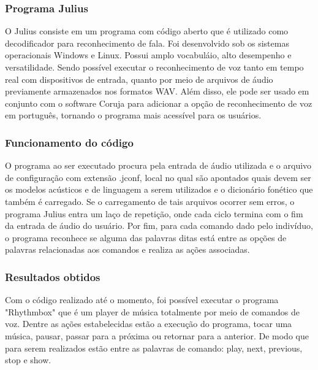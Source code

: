 \subsubsection{Programa Julius}

O Julius consiste em um programa com código aberto que é utilizado como decodificador para reconhecimento de fala. 
Foi desenvolvido sob os sistemas operacionais Windows e Linux. Possui amplo vocabuláio, alto desempenho e versatilidade. 
Sendo possível executar o reconhecimento de voz tanto em tempo real com dispositivos de entrada, quanto por meio de arquivos de áudio previamente armazenados nos formatos WAV.
Além disso, ele pode ser usado em conjunto com o software Coruja para adicionar a opção de reconhecimento de voz em português, tornando o programa mais acessível para os usuários.


\subsubsection{Funcionamento do código}

O programa ao ser executado procura pela entrada de áudio utilizada e o arquivo de configuração com extensão .jconf, local no qual são apontados quais devem ser os modelos acústicos e de linguagem a serem utilizados e o dicionário fonético que também é carregado. 
Se o carregamento de tais arquivos ocorrer sem erros, o programa Julius entra um laço de repetição, onde cada ciclo termina com o fim da entrada de áudio do usuário. Por fim, para cada comando dado pelo indivíduo, o programa reconhece se alguma das palavras ditas está entre as opções de palavras relacionadas aos comandos e realiza as ações associadas.  

\subsubsection{Resultados obtidos}

Com o código realizado até o momento, foi possível executar o programa "Rhythmbox" que é um player de música totalmente por meio de comandos de voz. 
Dentre as ações estabelecidas estão a execução do programa, tocar uma música, pausar, passar para a próxima ou retornar para a anterior.
De modo que para serem realizados estão entre as palavras de comando: play, next, previous, stop e show.


